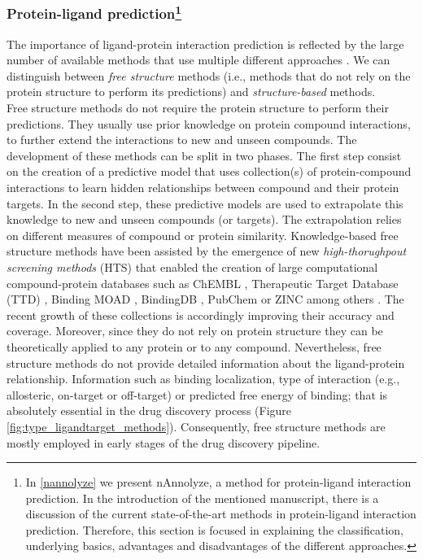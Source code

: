 \documentclass[11pt, b5paper,twoside]{tesi_upf}
\begin{document}
\subsubsection{Protein-ligand prediction\protect\footnote{In \cref{nannolyze} we present nAnnolyze, a method for protein-ligand interaction prediction. In the introduction of the mentioned manuscript, there is a discussion of the current state-of-the-art methods in protein-ligand interaction prediction. Therefore, this section is focused in explaining the classification, underlying basics, advantages and disadvantages of the different approaches.}}\label{prediction ligand-target}

The importance of ligand-protein interaction prediction is reflected by the large number of available methods that use multiple different approaches \cite{Csermely2013, prathipati2015}. We can distinguish between \textit{free structure} methods (i.e., methods that do not rely on the protein structure to perform its predictions) and \textit{structure-based} methods. \\    
Free structure methods do not require the protein structure to perform their predictions. They usually use prior knowledge on protein compound interactions, to further extend the interactions to new and unseen compounds. The development of these methods can be split in two phases. The first step consist on the creation of a predictive model that uses collection(s) of protein-compound interactions to learn hidden relationships between compound and their protein targets.  In the second step, these predictive models are used to extrapolate this knowledge to new and unseen compounds (or targets). The extrapolation relies on different measures of compound or protein similarity. Knowledge-based free structure methods have been assisted by the emergence of new \textit{high-thorughpout screening methods} (HTS) that enabled the creation of large computational compound-protein databases such as ChEMBL \cite{Bento2014}, Therapeutic Target Database (TTD) \cite{Zhu2012a}, Binding MOAD \cite{Hu2005}, BindingDB \cite{Liu2007}, PubChem \cite{Kim2016, Wang2014} or ZINC among others \cite{Irwin2012}. The recent growth of these collections is accordingly improving their accuracy and coverage. Moreover, since they do not rely on protein structure they can be theoretically applied to any protein or to any compound. Nevertheless, free structure methods do not provide detailed information about the ligand-protein relationship. Information such as binding localization, type of interaction (e.g., allosteric, on-target or off-target) or predicted free energy of binding;  that is absolutely essential in the drug discovery process (Figure \ref{fig:type_ligandtarget_methods}). Consequently, free structure methods are mostly employed in early stages of the drug discovery pipeline. 
\end{document}
